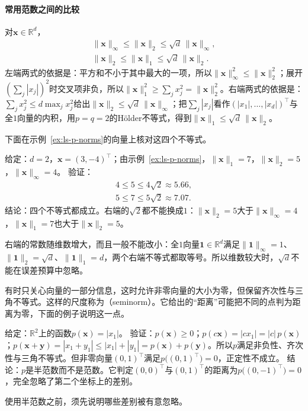 \paragraph{常用范数之间的比较}
对$\bm x\in\mathbb R^d$，
\[
 \begin{gathered}
 \lVert\bm x\rVert_\infty\leq\lVert\bm x\rVert_2\leq\sqrt d\,\lVert\bm x\rVert_\infty,
 \\
 \lVert\bm x\rVert_2\leq\lVert\bm x\rVert_1\leq\sqrt d\,\lVert\bm x\rVert_2.
 \end{gathered}
\]
左端两式的依据是：平方和不小于其中最大的一项，所以$\lVert\bm x\rVert_\infty^2\leq\lVert\bm x\rVert_2^2$；展开$(\sum_j|x_j|)^2$时交叉项非负，所以$\lVert\bm x\rVert_1^2\geq\sum_jx_j^2=\lVert\bm x\rVert_2^2$。右端两式的依据是：$\sum_jx_j^2\leq d\max_jx_j^2$给出$\lVert\bm x\rVert_2\leq\sqrt d\,\lVert\bm x\rVert_\infty$；把$\sum_j|x_j|$看作$(|x_1|,\ldots,|x_d|)^\top$与全$1$向量的内积，用$p=q=2$的Hölder不等式，得到$\lVert\bm x\rVert_1\leq\sqrt d\,\lVert\bm x\rVert_2$。

下面在示例~\ref{ex:ls-p-norms}的向量上核对这四个不等式。
\begin{example}[范数比较的数值核对]
\label{ex:ls-norm-comparison-check}
给定：$d=2$，$\bm x=(3,-4)^\top$；由示例~\ref{ex:ls-p-norms}，$\lVert\bm x\rVert_1=7$，$\lVert\bm x\rVert_2=5$，$\lVert\bm x\rVert_\infty=4$。
验证：
\[
 \begin{gathered}
 4\leq5\leq4\sqrt2\approx5.66,\\
 5\leq7\leq5\sqrt2\approx7.07.
 \end{gathered}
\]
结论：四个不等式都成立。右端的$\sqrt2$都不能换成$1$：$\lVert\bm x\rVert_2=5$大于$\lVert\bm x\rVert_\infty=4$，$\lVert\bm x\rVert_1=7$也大于$\lVert\bm x\rVert_2=5$。
\end{example}
右端的常数随维数增大，而且一般不能改小：全$1$向量$\bm 1\in\mathbb R^d$满足$\lVert\bm 1\rVert_\infty=1$、$\lVert\bm 1\rVert_2=\sqrt d$、$\lVert\bm 1\rVert_1=d$，两个右端不等式都取等号。所以维数较大时，$\sqrt d$不能在误差预算中忽略。


有时只关心向量的一部分信息，这时允许非零向量的大小为零，但保留齐次性与三角不等式。这样的尺度称为（seminorm）。它给出的“距离”可能把不同的点判为距离为零，下面的例子说明这一点。
\begin{example}[只看第一个坐标的半范数]
\label{ex:ls-seminorm-first-coordinate}
给定：$\mathbb R^2$上的函数$p(\bm x)=|x_1|$。
验证：$p(\bm x)\geq0$；$p(c\bm x)=|cx_1|=|c|\,p(\bm x)$；$p(\bm x+\bm y)=|x_1+y_1|\leq|x_1|+|y_1|=p(\bm x)+p(\bm y)$。所以$p$满足非负性、齐次性与三角不等式。但非零向量$(0,1)^\top$满足$p\bigl((0,1)^\top\bigr)=0$，正定性不成立。
结论：$p$是半范数而不是范数。它判定$(0,0)^\top$与$(0,1)^\top$的距离为$p\bigl((0,-1)^\top\bigr)=0$，完全忽略了第二个坐标上的差别。
\end{example}
使用半范数之前，须先说明哪些差别被有意忽略。

